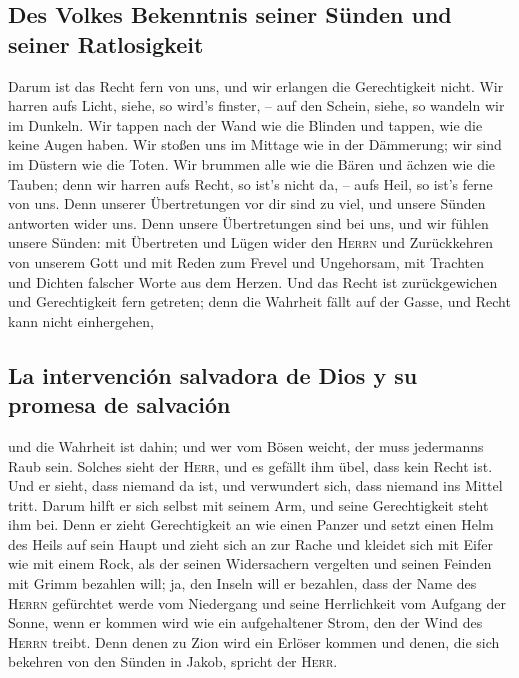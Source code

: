 \hypertarget{des-volkes-bekenntnis-seiner-suxfcnden-und-seiner-ratlosigkeit}{%
\subsection{Des Volkes Bekenntnis seiner Sünden und seiner
Ratlosigkeit}\label{des-volkes-bekenntnis-seiner-suxfcnden-und-seiner-ratlosigkeit}}

 Darum ist das Recht fern von uns, und wir erlangen die
Gerechtigkeit nicht. Wir harren aufs Licht, siehe, so wird's finster, --
auf den Schein, siehe, so wandeln wir im Dunkeln.  Wir
tappen nach der Wand wie die Blinden und tappen, wie die keine Augen
haben. Wir stoßen uns im Mittage wie in der Dämmerung; wir sind im
Düstern wie die Toten.  Wir brummen alle wie die Bären
und ächzen wie die Tauben; denn wir harren aufs Recht, so ist's nicht
da, -- aufs Heil, so ist's ferne von uns.  Denn unserer
Übertretungen vor dir sind zu viel, und unsere Sünden antworten wider
uns. Denn unsere Übertretungen sind bei uns, und wir fühlen unsere
Sünden:  mit Übertreten und Lügen wider den
\textsc{Herrn} und Zurückkehren von unserem Gott und mit Reden zum
Frevel und Ungehorsam, mit Trachten und Dichten falscher Worte aus dem
Herzen.  Und das Recht ist zurückgewichen und
Gerechtigkeit fern getreten; denn die Wahrheit fällt auf der Gasse, und
Recht kann nicht einhergehen,

\hypertarget{la-intervenciuxf3n-salvadora-de-dios-y-su-promesa-de-salvaciuxf3n}{%
\subsection{La intervención salvadora de Dios y su promesa de
salvación}\label{la-intervenciuxf3n-salvadora-de-dios-y-su-promesa-de-salvaciuxf3n}}

 und die Wahrheit ist dahin; und wer vom Bösen weicht,
der muss jedermanns Raub sein. Solches sieht der \textsc{Herr}, und es
gefällt ihm übel, dass kein Recht ist.  Und er sieht,
dass niemand da ist, und verwundert sich, dass niemand ins Mittel tritt.
Darum hilft er sich selbst mit seinem Arm, und seine Gerechtigkeit steht
ihm bei.  Denn er zieht Gerechtigkeit an wie einen Panzer
und setzt einen Helm des Heils auf sein Haupt und zieht sich an zur
Rache und kleidet sich mit Eifer wie mit einem Rock,  als
der seinen Widersachern vergelten und seinen Feinden mit Grimm bezahlen
will; ja, den Inseln will er bezahlen,  dass der Name des
\textsc{Herrn} gefürchtet werde vom Niedergang und seine Herrlichkeit
vom Aufgang der Sonne, wenn er kommen wird wie ein aufgehaltener Strom,
den der Wind des \textsc{Herrn} treibt.  Denn denen zu
Zion wird ein Erlöser kommen und denen, die sich bekehren von den Sünden
in Jakob, spricht der \textsc{Herr}.


